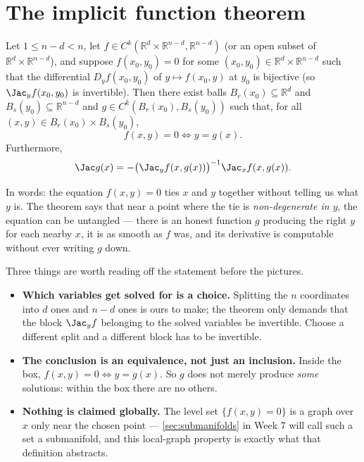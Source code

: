 \section{The implicit function theorem}
\label{sec:implicit_function_theorem}

\begin{theorem}
\label{thm:implicit_function_theorem}
Let $1 \leq n-d < n$, let $f \in C^k(\mathbb{R}^d\times\mathbb{R}^{n-d}, \mathbb{R}^{n-d})$ (or an
open subset of $\mathbb{R}^d\times\mathbb{R}^{n-d}$), and suppose $f(x_0,y_0) = 0$ for some
$(x_0,y_0) \in \mathbb{R}^d\times\mathbb{R}^{n-d}$ such that the differential $D_yf(x_0,y_0)$ of
$y \mapsto f(x_0,y)$ at $y_0$ is bijective (so $\Jac_yf(x_0,y_0)$ is invertible). Then there exist
balls $B_r(x_0) \subseteq \mathbb{R}^d$ and $B_s(y_0) \subseteq \mathbb{R}^{n-d}$ and
$g \in C^k(B_r(x_0), B_s(y_0))$ such that, for all $(x,y) \in B_r(x_0)\times B_s(y_0)$,
\[f(x,y) = 0 \iff y = g(x).\]
Furthermore,
\[\Jac g(x) = -\big(\Jac_yf(x,g(x))\big)^{-1}\Jac_xf(x,g(x)).\]
\end{theorem}

In words: the equation $f(x,y)=0$ ties $x$ and $y$ together without telling us what $y$ is. The
theorem says that near a point where the tie is \emph{non-degenerate in $y$}, the equation can be
untangled --- there is an honest function $g$ producing the right $y$ for each nearby $x$, it is
as smooth as $f$ was, and its derivative is computable without ever writing $g$ down.

Three things are worth reading off the statement before the pictures.
\begin{itemize}
  \item \textbf{Which variables get solved for is a choice.} Splitting the $n$ coordinates into
    $d$  ones and $n-d$  ones is ours to make; the theorem only demands that
    the block $\Jac_yf$ belonging to the solved variables be invertible. Choose a different
    split and a different block has to be invertible.
  \item \textbf{The conclusion is an equivalence, not just an inclusion.} Inside the box,
    $f(x,y)=0 \iff y=g(x)$. So $g$ does not merely produce \emph{some} solutions: within the
    box there are no others.
  \item \textbf{Nothing is claimed globally.} The level set $\{f(x,y)=0\}$ is a graph over $x$
    only near the chosen point --- \cref{sec:submanifolds} in Week 7 will call such a set a
    submanifold, and this local-graph property is exactly what that definition abstracts.
\end{itemize}

